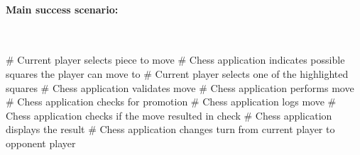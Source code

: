 \documentclass{article}
\begin{document}
\paragraph{Main success scenario:}\mbox{}\\
\begin{easylist}[enumerate]
# Current player selects piece to move
# Chess application indicates possible squares the player can move to
# Current player selects one of the highlighted squares
# Chess application validates move
# Chess application performs move
# Chess application checks for promotion
# Chess application logs move
# Chess application checks if the move resulted in check
# Chess application displays the result
# Chess application changes turn from current player to opponent player
\end{easylist}
\end{document}
